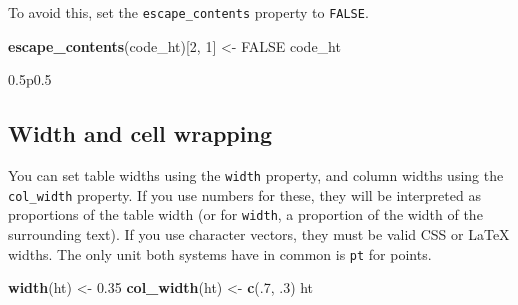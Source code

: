 \documentclass[]{article}
\newenvironment{Shaded}{\begin{snugshade}}{\end{snugshade}}
\newcommand{\KeywordTok}[1]{\textcolor[rgb]{0.13,0.29,0.53}{\textbf{#1}}}
\newcommand{\DecValTok}[1]{\textcolor[rgb]{0.00,0.00,0.81}{#1}}
\newcommand{\FloatTok}[1]{\textcolor[rgb]{0.00,0.00,0.81}{#1}}
\newcommand{\StringTok}[1]{\textcolor[rgb]{0.31,0.60,0.02}{#1}}
\newcommand{\OtherTok}[1]{\textcolor[rgb]{0.56,0.35,0.01}{#1}}
\newcommand{\NormalTok}[1]{#1}
\begin{document}
\FloatBarrier

To avoid this, set the \texttt{escape\_contents} property to
\texttt{FALSE}.

\begin{Shaded}
\begin{Highlighting}[]
\KeywordTok{escape_contents}\NormalTok{(code_ht)[}\DecValTok{2}\NormalTok{, }\DecValTok{1}\NormalTok{] <-}\StringTok{ }\OtherTok{FALSE}
\NormalTok{code_ht}
\end{Highlighting}
\end{Shaded}

\begin{table}[h]
\centering\begin{tabularx}{0.5\textwidth}{p{}}
\tabularnewline[-0.5pt]
\tabularnewline[-0.5pt]
\end{tabularx}

\end{table}

\FloatBarrier

\subsection{Width and cell wrapping}\label{width-and-cell-wrapping}

You can set table widths using the \texttt{width} property, and column
widths using the \texttt{col\_width} property. If you use numbers for
these, they will be interpreted as proportions of the table width (or
for \texttt{width}, a proportion of the width of the surrounding text).
If you use character vectors, they must be valid CSS or LaTeX widths.
The only unit both systems have in common is \texttt{pt} for points.

\begin{Shaded}
\begin{Highlighting}[]
\KeywordTok{width}\NormalTok{(ht) <-}\StringTok{ }\FloatTok{0.35}
\KeywordTok{col_width}\NormalTok{(ht) <-}\StringTok{ }\KeywordTok{c}\NormalTok{(.}\DecValTok{7}\NormalTok{, .}\DecValTok{3}\NormalTok{)}
\NormalTok{ht}
\end{Highlighting}
\end{Shaded}
\end{document}
